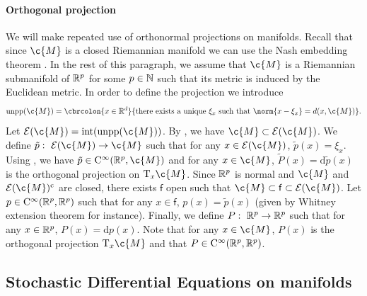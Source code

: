 \paragraph{Orthogonal projection}
We will make repeated use of orthonormal projections on manifolds.
Recall that since \(\c{M}\) is a closed Riemannian manifold we can use the Nash embedding theorem \parencite{gunther1991isometric}.
In the rest of this paragraph, we assume that \(\c{M}\) is a Riemannian submanifold of \(\mathbb{R}^p\) for some \(p \in \mathbb{N}\) such that its metric is induced by the Euclidean metric.
In order to define the projection we introduce \begin{equation} \mathrm{unpp}(\c{M}) = \cbrcolon{x \in \R^d}{\text{there exists a unique \(\xi_x\) such that \(\norm{x - \xi_x} = d(x, \c{M})\)}} .
\end{equation}
Let \(\mathcal{E}(\c{M}) = \mathrm{int}(\mathrm{unpp}(\c{M}))\).
By \textcite[Theorem 1]{leobacher2021existence}, we have \(\c{M} \subset \mathcal{E}(\c{M})\).
We define \(\tilde{p}: \ \mathcal{E}(\c{M}) \to \c{M}\) such that for any \(x \in \mathcal{E}(\c{M})\), \(\tilde{p}(x) = \xi_x\).
Using \textcite[Theorem 2]{leobacher2021existence}, we have \(\tilde{p} \in \mathrm{C}^\infty(\R^p, \c{M})\) and for any \(x \in \c{M}\), \(\tilde{P}(x) = \mathrm{d} \tilde{p}(x)\) is the orthogonal projection on \(\mathrm{T}_x\c{M}\).
Since \(\mathbb{R}^p\) is normal and \(\c{M}\) and \(\mathcal{E}(\c{M})^\mathrm{c}\) are closed, there exists \(\mathsf{f}\) open such that \(\c{M} \subset \mathsf{f} \subset \mathcal{E}(\c{M})\).
Let \(p \in \mathrm{C}^\infty(\mathbb{R}^p, \mathbb{R}^p)\) such that for any \(x \in \mathsf{f}\), \(p(x) = \tilde{p}(x)\) (given by Whitney extension theorem for instance).
Finally, we define \(P: \ \mathbb{R}^p \to \mathbb{R}^p\) such that for any \(x \in \mathbb{R}^p\), \(P(x) = \mathrm{d} p(x)\).
Note that for any \(x \in \c{M}\), \(P(x)\) is the orthogonal projection \(\mathrm{T}_x \c{M}\) and that \(P \in \mathrm{C}^\infty(\mathbb{R}^p, \mathbb{R}^p)\).

\subsection{Stochastic Differential Equations on manifolds}
\label{sec:stoch-diff-equat}

